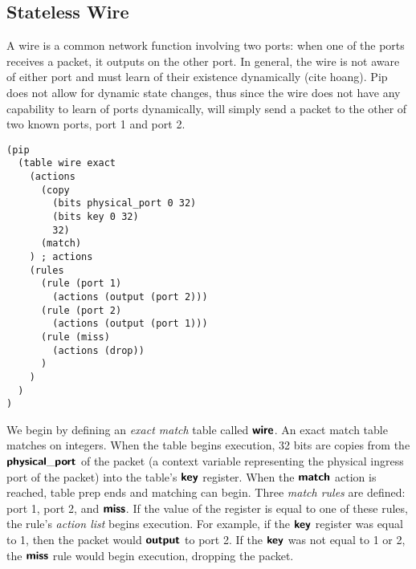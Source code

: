 \subsection{Stateless Wire}
\indent A wire is a common network function involving two ports: when one of the ports receives a packet, it outputs on the other port. In general, the wire is not aware of either port and must learn of their existence dynamically (cite hoang). Pip does not allow for dynamic state changes, thus since the wire does not have any capability to learn of ports dynamically, will simply send a packet to the other of two known ports, port 1 and port 2.
\begin{mdframed}
\begin{verbatim}
(pip
  (table wire exact
    (actions
      (copy
        (bits physical_port 0 32)
        (bits key 0 32)
        32)
      (match)
    ) ; actions
    (rules
      (rule (port 1)
        (actions (output (port 2)))
      (rule (port 2)
        (actions (output (port 1)))
      (rule (miss)
        (actions (drop))
      )
    )
  )
)
\end{verbatim}
\end{mdframed}

We begin by defining an \textit{exact match} table called $\bm{\mathsf{{wire}}}$. An exact match table matches on integers. When the table begins execution, 32 bits are copies from the $\bm{\mathsf{{physical\_port}}}$ of the packet (a context variable representing the physical ingress port of the packet) into the table's $\bm{\mathsf{{key}}}$ register. When the $\bm{\mathsf{{match}}}$ action is reached, table prep ends and matching can begin. Three \textit{match rules} are defined: port 1, port 2, and $\bm{\mathsf{{miss}}}$. If the value of the  register is equal to one of these rules, the rule's \textit{action list} begins execution. For example, if the $\bm{\mathsf{{key}}}$ register was equal to 1, then the packet would $\bm{\mathsf{{output}}}$ to port 2. If the $\bm{\mathsf{{key}}}$ was not equal to 1 or 2, the $\bm{\mathsf{{miss}}}$ rule would begin execution, dropping the packet.

